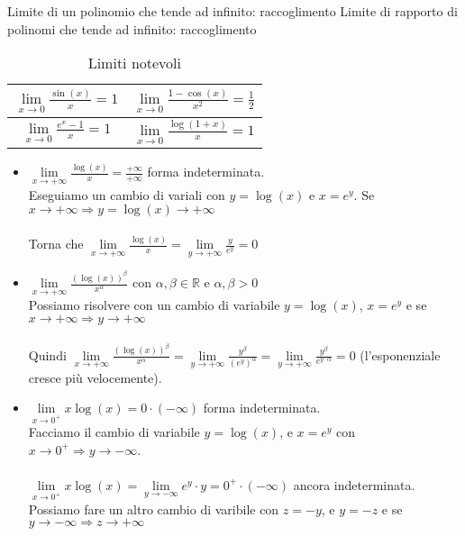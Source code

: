 Limite di un polinomio che tende ad infinito: raccoglimento
Limite di rapporto di polinomi che tende ad infinito: raccoglimento

\begin{table}[h!]
	\centering
	\setlength{\tabcolsep}{10pt}
	\renewcommand{\arraystretch}{2.5}
	\begin{tabular}{|c|c|}
		\hline
		$\lim\limits_{x\to 0}\frac{\sin(x)}{x} = 1$ & $\lim\limits_{x\to 0} \frac{1-\cos(x)}{x^2} = \frac{1}{2}$ \\\hline
		$\lim\limits_{x\to 0}\frac{e^x-1}{x} = 1$ & $\lim\limits_{x\to 0}\frac{\log(1+x)}{x} = 1$\\
		\hline
	\end{tabular}
	\caption{Limiti notevoli}
\end{table}

\begin{itemize}
	\item $\lim\limits_{x\to +\infty}\frac{\log(x)}{x} = \frac{+\infty}{+\infty}$ forma indeterminata.\\
	Eseguiamo un cambio di variali con $y = \log(x)$ e $x = e^y$. Se $x\to +\infty \Longrightarrow y = \log(x) \to +\infty$\\\\
	Torna che $\lim\limits_{x \to +\infty}\frac{\log(x)}{x} = \lim\limits_{y\to +\infty}\frac{y}{e^y} = 0$
	\item $\lim\limits_{x\to +\infty}\frac{(\log(x))^\beta}{x^\alpha}$ con $\alpha, \beta \in \mathbb{R}$ e $\alpha, \beta > 0$\\
	Possiamo risolvere con un cambio di variabile $y = \log(x)$, $x = e^y$ e se $x \to +\infty \Longrightarrow y\to +\infty$\\\\
	Quindi $\lim\limits_{x\to +\infty}\frac{(\log(x))^\beta}{x^\alpha} = \lim\limits_{y \to +\infty}\frac{y^\beta}{(e^y)^\alpha} = \lim\limits_{y \to +\infty}\frac{y^\beta}{e^{y\cdot\alpha}} = 0$  (l'esponenziale cresce più velocemente).
	\item $\lim\limits_{x\to 0^+}x\log(x) = 0 \cdot (-\infty)$ forma indeterminata.\\
	Facciamo il cambio di variabile $y = \log(x)$, e $x = e^y$ con $x\to 0^+ \Longrightarrow y\to -\infty$.\\\\
	$\lim\limits_{x\to 0^+}x\log(x) = \lim\limits_{y\to -\infty}e^y \cdot y = 0^+ \cdot (-\infty)$ ancora indeterminata.\\
	Possiamo fare un altro cambio di varibile con $z = -y$, e $y = -z$ e se $y \to -\infty \Longrightarrow z \to +\infty$\\\\

\end{itemize}
